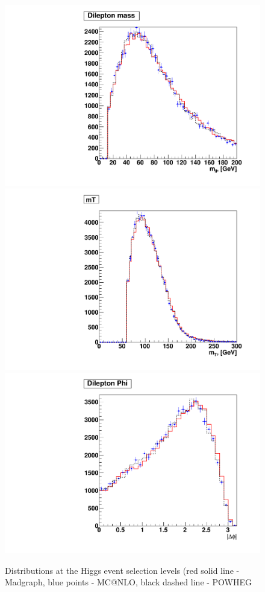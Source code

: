 \begin{figure}[!hbtp]
\centering
\includegraphics[width=.45\textwidth]{figures/wwshape_ref_mll_hww}
\includegraphics[width=.45\textwidth]{figures/wwshape_ref_mt_hww}
\includegraphics[width=.45\textwidth]{figures/wwshape_ref_dphi_hww}
\caption{Distributions at the Higgs event selection levels (red solid line - Madgraph, blue points - MC@NLO, black dashed line - POWHEG}
\label{fig:appendix_wwshape_ref_hww}
\end{figure}

